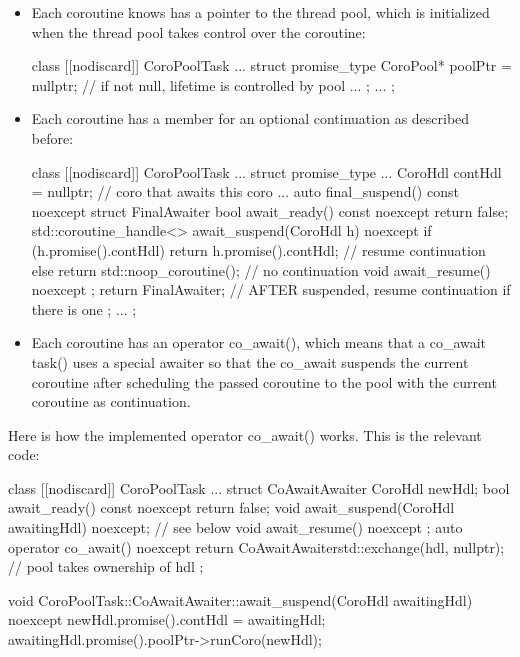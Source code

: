 \begin{itemize}
\item 
Each coroutine knows has a pointer to the thread pool, which is initialized when the thread pool takes control over the coroutine:

\begin{cpp}
class [[nodiscard]] CoroPoolTask
{
	...
	struct promise_type {
		CoroPool* poolPtr = nullptr; // if not null, lifetime is controlled by pool
		...
	};
	...
};
\end{cpp}

\item 
Each coroutine has a member for an optional continuation as described before:

\begin{cpp}
class [[nodiscard]] CoroPoolTask
{
	...
	struct promise_type {
		...
		CoroHdl contHdl = nullptr; // coro that awaits this coro
		...
		auto final_suspend() const noexcept {
			struct FinalAwaiter {
				bool await_ready() const noexcept { return false; }
				std::coroutine_handle<> await_suspend(CoroHdl h) noexcept {
					if (h.promise().contHdl) {
						return h.promise().contHdl; // resume continuation
					}
					else {
						return std::noop_coroutine(); // no continuation
					}
				}
				void await_resume() noexcept {}
			};
			return FinalAwaiter{}; // AFTER suspended, resume continuation if there is one
		}
	};
	...
};
\end{cpp}

\item 
Each coroutine has an operator co\_await(), which means that a co\_await task() uses a special awaiter so that the co\_await suspends the current coroutine after scheduling the passed coroutine to the pool with the current coroutine as continuation.
\end{itemize}

Here is how the implemented operator co\_await() works. This is the relevant code:

\begin{cpp}
class [[nodiscard]] CoroPoolTask
{
	...
	struct CoAwaitAwaiter {
		CoroHdl newHdl;
		bool await_ready() const noexcept { return false; }
		void await_suspend(CoroHdl awaitingHdl) noexcept; // see below
		void await_resume() noexcept {}
	};
	auto operator co_await() noexcept {
		return CoAwaitAwaiter{std::exchange(hdl, nullptr)}; // pool takes ownership of hdl
	}
};

void CoroPoolTask::CoAwaitAwaiter::await_suspend(CoroHdl awaitingHdl) noexcept
{
	newHdl.promise().contHdl = awaitingHdl;
	awaitingHdl.promise().poolPtr->runCoro(newHdl);
}
\end{cpp}

